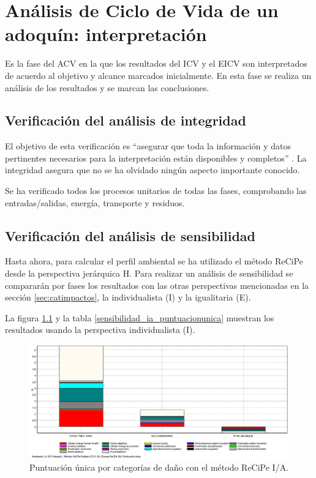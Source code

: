 \chapter{Análisis de Ciclo de Vida de un adoquín: interpretación}\label{cap:acv_interpretacion}

Es la fase del ACV en la que los resultados del ICV y el EICV son interpretados de acuerdo al objetivo y alcance marcados inicialmente. En esta fase se realiza un análisis de los resultados y se marcan las conclusiones.

\section{Verificación del análisis de integridad}

El objetivo de esta verificación es ``asegurar que toda la información y datos pertinentes necesarios para la interpretación están disponibles y completos'' \cite{iso14044}. La integridad asegura que no se ha olvidado ningún aspecto importante conocido.

Se ha verificado todos los procesos unitarios de todas las fases, comprobando las entradas/salidas, energía, transporte y residuos.

\section{Verificación del análisis de sensibilidad}

Hasta ahora, para calcular el perfil ambiental se ha utilizado el método ReCiPe desde la perspectiva jerárquica H. Para realizar un análisis de sensibilidad se compararán por fases los resultados con las otras perspectivas mencionadas en la sección \ref{sec:catimpactos}, la individualista (I) y la igualitaria (E).

La figura \ref{fig:sensibilidad_ia_puntuacionunica} y la tabla \ref{sensibilidad_ia_puntuacionunica} muestran los resultados usando la perspectiva individualista (I).

\begin{figure}[!htb]
\centering
\includegraphics[width=15cm]{img/sensibilidad_ia_puntuacionunica.png}
\caption{Puntuación única por categorías de daño con el método ReCiPe I/A.}
\label{fig:sensibilidad_ia_puntuacionunica}
\end{figure}

